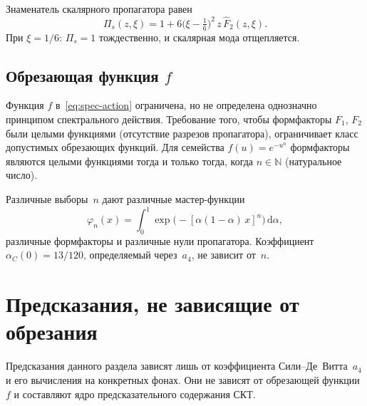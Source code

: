 \documentclass[12pt,a4paper]{article}
\theoremstyle{plain}
\theoremstyle{definition}
\theoremstyle{remark}
\newcommand{\dd}{\mathrm{d}}
\begin{document}
Знаменатель скалярного пропагатора равен
\begin{equation}\label{eq:Pis}
  \Pi_s(z, \xi) = 1 + 6\bigl(\xi - \tfrac{1}{6}\bigr)^2\,
  z\, \hat{F}_2(z, \xi).
\end{equation}
При $\xi = 1/6$: $\Pi_s = 1$ тождественно, и скалярная мода
отщепляется.

\subsection{Обрезающая функция $f$}
\label{sec:cutoff}

Функция $f$ в~\eqref{eq:spec-action} ограничена, но не определена
однозначно принципом спектрального действия. Требование того, чтобы формфакторы $F_1$, $F_2$ были целыми
функциями (отсутствие разрезов пропагатора), ограничивает класс
допустимых обрезающих функций.
Для семейства $f(u) = e^{-u^n}$ формфакторы являются целыми
функциями тогда и только тогда, когда $n \in \mathbb{N}$
(натуральное число).

Различные выборы~$n$ дают различные мастер-функции
\begin{equation}\label{eq:phi-n}
  \varphi_n(x) = \int_0^1
  \exp\bigl(-[\alpha(1-\alpha)\, x]^n\bigr)\, \dd\alpha,
\end{equation}
различные формфакторы и различные нули пропагатора. Коэффициент $\alpha_C(0) = 13/120$, определяемый через~$a_4$,
не зависит от~$n$.

\section{Предсказания, не зависящие от обрезания}
\label{sec:robust}

Предсказания данного раздела зависят лишь от коэффициента
Сили--Де~Витта~$a_4$ и его вычисления на конкретных фонах.
Они не зависят от обрезающей функции~$f$ и составляют ядро
предсказательного содержания СКТ.
\end{document}
